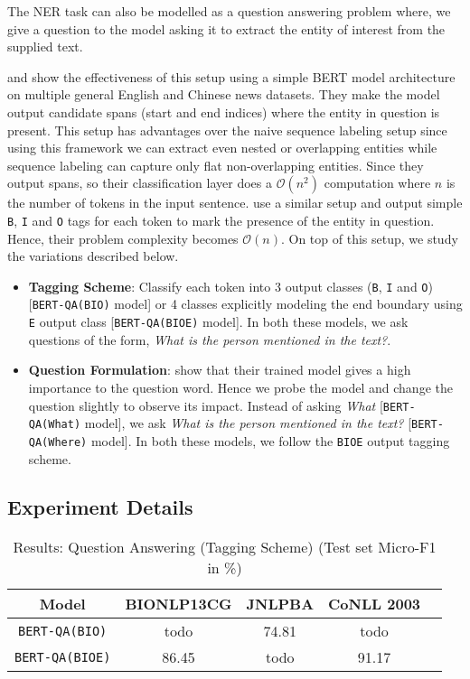 The NER task can also be modelled as a question answering problem where, we give a question to the model asking it to extract the entity of interest from the supplied text. 

\cite{li2019unified} and \cite{li2019dice} show the effectiveness of this setup using a simple BERT model architecture on multiple general English and Chinese news datasets. They make the model output candidate spans (start and end indices) where the entity in question is present. This setup has advantages over the naive sequence labeling setup since using this framework we can extract even nested or overlapping entities while sequence labeling can capture only flat non-overlapping entities. Since they output spans, so their classification layer does a $\mathcal{O}(n^2)$ computation where $n$ is the number of tokens in the input sentence. \cite{banerjee2019knowledge} use a similar setup and output simple \texttt{B}, \texttt{I} and \texttt{O} tags for each token to mark the presence of the entity in question. Hence, their problem complexity becomes $\mathcal{O}(n)$. On top of this setup, we study the variations described below.

\begin{itemize}
    \item \textbf{Tagging Scheme}: Classify each token into 3 output classes (\texttt{B}, \texttt{I} and \texttt{O}) [\texttt{BERT-QA(BIO)} model] or 4 classes explicitly modeling the end boundary using \texttt{E} output class [\texttt{BERT-QA(BIOE)} model]. In both these models, we ask questions of the form, \textit{What is the person mentioned in the text?}.
    
    \item \textbf{Question Formulation}: \cite{banerjee2019knowledge} show that their trained model gives a high importance to the question word. Hence we probe the model and change the question slightly to observe its impact. Instead of asking \textit{What} [\texttt{BERT-QA(What)} model], we ask \textit{What is the person mentioned in the text?} [\texttt{BERT-QA(Where)} model]. In both these models, we follow the \texttt{BIOE} output tagging scheme.
\end{itemize}

\subsection{Experiment Details}


\begin{table}[h!]
\centering
\begin{tabular}{|c|c|c|c|c|}\hline
	\textbf{Model} & \textbf{BIONLP13CG} & \textbf{JNLPBA} & \textbf{CoNLL 2003}\\\hline
	\texttt{BERT-QA(BIO)} & todo & 74.81 & todo\\\hline
	\texttt{BERT-QA(BIOE)} & 86.45 & todo & 91.17\\\hline
	\end{tabular}
    \caption{Results: Question Answering (Tagging Scheme) (Test set Micro-F1 in \%)}
    \label{tab:res_qa_tagging}
\end{table}

